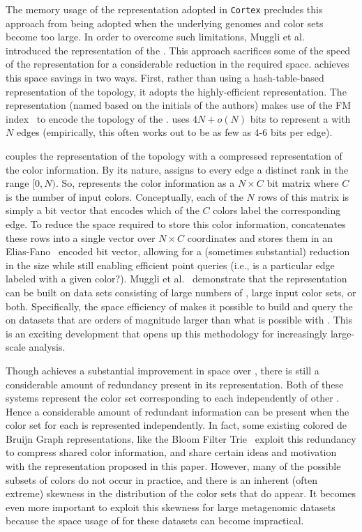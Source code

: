 The memory usage of the \cdbg representation adopted in \texttt{Cortex}
precludes this approach from being adopted when the underlying genomes and color
sets become too large. In order to overcome such limitations, Muggli et
al.~\cite{MuggliBoNo17} introduced the \vari representation of the \cdbg. This
approach sacrifices some of the speed of the \cortex representation for a
considerable reduction in the required space. \vari achieves this space savings
in two ways.  First, rather than using a hash-table-based representation of the
\dbg topology, it adopts the highly-efficient \boss representation. The
\boss~\cite{BoweOn12} representation (named based on the initials of the
authors) makes use of the FM index~\cite{FerraginaMa00} to encode the topology
of the \dbg. \boss uses $4N + o(N)$ bits to represent a \dbg with $N$ edges
(empirically, this often works out to be as few as 4-6 bits per edge).

\vari couples the \boss representation of the \dbg topology with a compressed
representation of the color information. By its nature, \boss assigns to every
\dbg edge a distinct rank in the range $[0,N)$. So, \vari represents the color
  information as a $N \times C$ bit matrix where $C$ is the number of input colors.
  Conceptually, each of the $N$ rows of this matrix is simply a bit vector that
  encodes which of the $C$ colors label the corresponding edge. To reduce the
  space required to store this color information, \vari concatenates these rows
  into a single vector over $N \times C$ coordinates and stores them in an
  Elias-Fano~\cite{Elias74, Fano71} encoded bit vector, allowing for a
  (sometimes substantial) reduction in the size while still enabling efficient
  point queries (i.e., is a particular edge labeled with a given color?).
  Muggli et al.~\cite{MuggliBoNo17} demonstrate that the \vari representation
  can be built on data sets consisting of large numbers of \kmers, large input
  color sets, or both.  Specifically, the space efficiency of \vari makes it
  possible to build and query the \cdbg on datasets that are orders of magnitude
  larger than what is possible with \cortex.  This is an exciting development
  that opens up this methodology for increasingly large-scale analysis.

  Though \vari achieves a substantial improvement in space over \cortex, there
  is still a considerable amount of redundancy present in its representation.
  Both of these systems represent the color set corresponding to each \kmer
  independently of other \kmers. Hence a considerable amount of redundant
  information can be present when the color set for each \kmer is represented
  independently. In fact, some existing colored de Bruijn Graph representations,
  like the Bloom Filter Trie~\cite{holley2016bloom} exploit this redundancy to
  compress shared color information, and share certain ideas and motivation with
  the representation proposed in this paper. However, many of the possible
  subsets of colors do not occur in practice, and there is an inherent (often
  extreme) skewness in the distribution of the color sets that do appear. It
  becomes even more important to exploit this skewness for large metagenomic
  datasets because the space usage of \vari for these datasets can become
  impractical.

